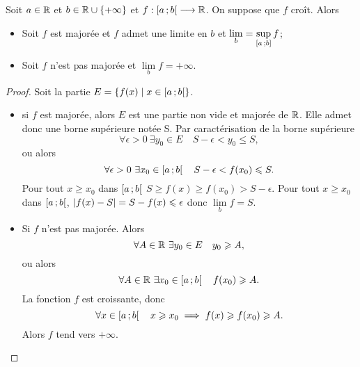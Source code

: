 \begin{theo}
  Soit \(a \in \mathbb{R}\) et \(b \in \mathbb{R}\cup\{+\infty\}\) et \(f : \left[ a \, ; {} b \right[
  \longrightarrow \mathbb{R}\). On suppose que \(f\) croît. Alors
  \begin{itemize}
    \item Soit \(f\) est majorée et \(f\) admet une limite en \(b\) et
      \(\lim\limits_{b} = \sup\limits_{\left[ a \, ; {} b \right]}f\);
    \item Soit \(f\) n'est pas majorée et \(\lim\limits_{b}f=+\infty\).
  \end{itemize}
\end{theo}
\begin{proof}
  Soit la partie \(E=\left\{f(x)\mathrel{}\middle|\mathrel{}x \in \left[ a \, ; {} b \right[\right\}\).
  \begin{itemize}
    \item si \(f\) est majorée, alors \(E\) est une partie non vide et majorée
      de \(\mathbb{R}\). Elle admet donc une borne supérieure notée S. Par
      caractérisation de la borne supérieure
      \begin{equation}
        \forall \epsilon >0 \ \exists y_0 \in E \quad S-\epsilon <y_0 \leqslant
        S,
      \end{equation}
      ou alors
      \begin{equation}
        \forall \epsilon >0 \ \exists x_0 \in \left[ a \, ; {} b \right[ \quad
        S-\epsilon <f(x_0) \leqslant S.
      \end{equation}
      Pour tout \(x \geqslant x_0\) dans \(\left[ a \, ; {} b \right[\) \(S \geqslant
      f(x) \geqslant f(x_0) > S-\epsilon\). Pour tout \(x \geqslant x_0\) dans
      \(\left[ a \, ; {} b \right[\), \(\left\lvert f(x)-S\right\rvert=S-f(x) \leqslant \epsilon\) donc
      \(\lim\limits_{b} f =S\).
    \item Si \(f\) n'est pas majorée. Alors
      \begin{equation}
        \forall A \in \R \ \exists y_0 \in E \quad y_0 \geqslant A,
      \end{equation}
      ou alors
      \begin{equation}
        \forall A \in \mathbb{R} \ \exists x_0 \in \left[ a \, ; {} b \right[ \quad f(x_0)
        \geqslant A.
      \end{equation}
      La fonction \(f\) est croissante, donc
      \begin{equation}
        \forall x \in \left[ a \, ; {} b \right[ \quad x \geqslant x_0 \implies f(x)
        \geqslant f(x_0) \geqslant A.
      \end{equation}
      Alors \(f\) tend vers \(+\infty\).
  \end{itemize}
\end{proof}

